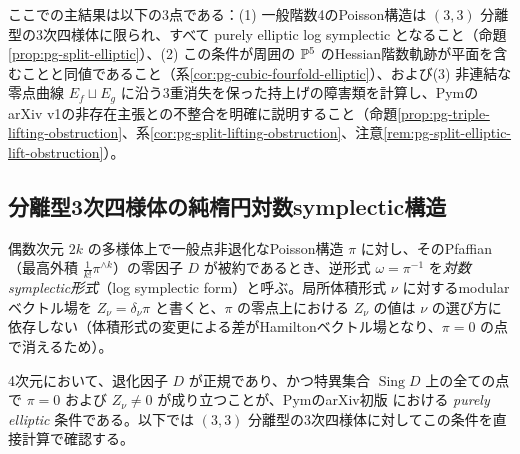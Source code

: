 ここでの主結果は以下の3点である：(1) 一般階数4のPoisson構造は $(3,3)$ 分離型の3次四様体に限られ、すべて purely elliptic log symplectic となること（命題\ref{prop:pg-split-elliptic}）、(2) この条件が周囲の $\mathbb P^5$ のHessian階数軌跡が平面を含むことと同値であること（系\ref{cor:pg-cubic-fourfold-elliptic}）、および(3) 非連結な零点曲線 $E_f\sqcup E_g$ に沿う3重消失を保った持上げの障害類を計算し、PymのarXiv v1の非存在主張との不整合を明確に説明すること（命題\ref{prop:pg-triple-lifting-obstruction}、系\ref{cor:pg-split-lifting-obstruction}、注意\ref{rem:pg-split-elliptic-lift-obstruction}）。

\subsection{分離型3次四様体の純楕円対数symplectic構造}
\label{subsec:pg-split-elliptic}
偶数次元 $2k$ の多様体上で一般点非退化なPoisson構造 $\pi$ に対し、そのPfaffian（最高外積 $\frac{1}{k!}\pi^{\wedge k}$）の零因子 $D$ が被約であるとき、逆形式 $\omega=\pi^{-1}$ を\emph{対数symplectic形式}（log symplectic form）と呼ぶ。局所体積形式 $\nu$ に対するmodularベクトル場を $Z_\nu=\delta_\nu\pi$ と書くと、$\pi$ の零点上における $Z_\nu$ の値は $\nu$ の選び方に依存しない（体積形式の変更による差がHamiltonベクトル場となり、$\pi=0$ の点で消えるため）。

4次元において、退化因子 $D$ が正規であり、かつ特異集合 $\operatorname{Sing}D$ 上の全ての点で $\pi=0$ および $Z_\nu\neq0$ が成り立つことが、PymのarXiv初版 \cite[Definition~4.2, Remark~4.4]{PPymElliptic} における \emph{purely elliptic} 条件である。以下では $(3,3)$ 分離型の3次四様体に対してこの条件を直接計算で確認する。


